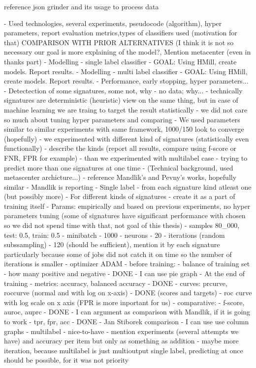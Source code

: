 reference json grinder and its usage to process data

- Used technologies, several experiments, pseudocode (algorithm), hyper parameters, report evaluation metrics,types of classifiers used (motivation for that) COMPARISON WITH PRIOR ALTERNATIVES (I think it is not so necessary our goal is more explaining of the model?, Mention metacenter (even in thanks part)
  - Modelling - single label classifier
    - GOAL: Using HMill, create models. Report results.
  - Modelling - multi label classifier
    - GOAL: Using HMill, create models. Report results.
  - Performance, early stopping, hyper parameters...
  - Detectection of some signatures, some not, why - no data; why...
    - technically signatures are deterministic (heuristic) view on the same thing, but in case of machine learning we are traing to target the result statistically
    - we did not care so much about tuning hyper parameters and comparing
       - We used parameters similar to similar experiments with same framework, 1000/150 look to converge (hopefully)
       - we experimented with different kind of signatures (statistically even functionally) - describe the kinds (report all results, compare using f-score or FNR, FPR for example)
       - than we experimented with multilabel case - trying to predict more than one signatures at one time
  - (Technical background, used metascenter archicture...)
  - reference Mandlik's and Pevny's works, hopefully similar
    - Mandlik is reporting
      - Single label - from each signature kind atleast one (but possibly more) - For different kinds of signatures - create it as a part of training itself
        - Params: empirically and based on previous experiments, no hyper parameters tuning (some of signatures have significant performance with chosen so we did not spend time with that, not goal of this thesis)
            - samples 80_000, test: 0.5, train: 0.5
            - minibatch - 1000
            - neurons - 20
            - iterations (random subssampling) - 120 (should be sufficient), mention it by each signature particularly because some of jobs did not catch it on time so the number of iterations is smaller
            - optimizer ADAM
        - before training:
            - balance of training set - how many positive and negative - DONE
                - I can use pie graph
        - At the end of training
            - metrics: accuracy, balanced accuracy - DONE
            - curves: prcurve, roccurve (normal and with log on x-axis) - DONE (scores and targets)
                - roc curve with log scale on x axis (FPR is more inportant for us)
            - comparative: 
                - f-score, auroc, auprc - DONE
                    - I can argument as comparison with Mandlik, if it is going to work
                - tpr, fpr, acc - DONE
                    - Jan Stiborek comparison
                    - I can use use column graphs
        - multilabel - nice-to-have
            - mention experiments (several attempts we have) and accuracy per item but only as something as addition - maybe more iteration, because multilabel is just multioutput single label, predicting at once should be possible, for it was not priority
        
      